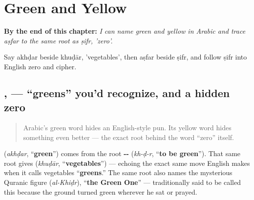 
\chapter{Green and Yellow}
\label{ch:ar-green-and-yellow}

\begin{chapteropening}
\textbf{By the end of this chapter:} \emph{I can name green and yellow in Arabic and trace aṣfar to the same root as ṣifr, 'zero'.}

Say akhḍar beside khuḍār, 'vegetables', then aṣfar beside ṣifr, and follow ṣifr into English zero and cipher.
\end{chapteropening}

\section[\texorpdfstring{\ar{أخضر}, \ar{أصفر} (akhḍar, aṣfar)}{أخضر, أصفر (akhḍar, aṣfar)}]{,  — \textquotedblleft{}greens\textquotedblright{} you'd recognize, and a hidden zero}

\label{lesson:AR-C22-akhdar-asfar}



\begin{quote}
Arabic's green word hides an English-style pun. Its yellow word hides something even better — the exact root behind the word \textquotedblleft{}zero\textquotedblright{} itself.
\end{quote}

\begin{culture}
\textbf{} (\emph{akhḍar}, \textquotedblleft{}\textbf{green}\textquotedblright{}) comes from the root \textbf{--} (\emph{kh-ḍ-r}, \textquotedblleft{}\textbf{to be green}\textquotedblright{}). That same root gives \textbf{} (\emph{khuḍār}, \textquotedblleft{}\textbf{vegetables}\textquotedblright{}) — echoing the exact same move English makes when it calls vegetables \textquotedblleft{}\textbf{greens}.\textquotedblright{} The same root also names the mysterious Quranic figure \textbf{} (\emph{al-Khiḍr}), \textquotedblleft{}\textbf{the Green One}\textquotedblright{} — traditionally said to be called this because the ground turned green wherever he sat or prayed.
\end{culture}


